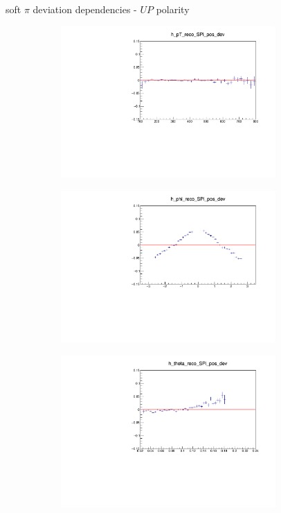 \documentclass[11pt]{beamer}
\begin{document}
\begin{frame}{soft $\pi$ deviation dependencies - $UP$ polarity}
\begin{figure}
\begin{subfigure}{0.45\textwidth}
\includegraphics[width=0.9\textwidth]{fourth/up_pdf/deviation/h_pt_reco_SPi_pos_dev.pdf}
\end{subfigure}
\begin{subfigure}{0.45\textwidth}
\includegraphics[width=0.9\textwidth]{fourth/up_pdf/deviation/h_phi_reco_SPi_pos_dev.pdf}
\end{subfigure}
\begin{subfigure}{0.45\textwidth}
\includegraphics[width=0.9\textwidth]{fourth/up_pdf/deviation/h_theta_reco_SPi_pos_dev.pdf}

\end{subfigure}
\end{figure}
\end{frame}
\end{document}
